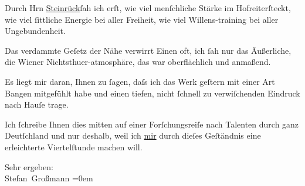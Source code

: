 \pstart
           Durch Hrn \uline{Steinrück}ſah ich erſt, wie viel menſchliche Stärke im Hofreiterſteckt, wie viel{ }ſittliche Energie bei aller Freiheit, wie viel
               Willens-training bei aller Ungebundenheit.\pend
           
\pstart
           Das verdammte Geſetz der Nähe verwirrt Einen oft, ich{ }ſah nur {\pb}das Äußerliche, die Wiener Nichtsthuer-atmosphäre, das war oberflächlich und
               anmaßend.\pend
           
\pstart
           Es liegt mir daran, Ihnen zu{ }ſagen, daſs ich das Werk geſtern mit einer Art Bangen
               mitgefühlt habe und einen tiefen, nicht{ }ſchnell zu verwiſchenden Eindruck nach Hauſe
               trage.\pend
           
\pstart
           Ich{ }ſchreibe Ihnen dies mitten auf einer Forſchungsreiſe nach Talenten durch ganz Deutſchland und nur deshalb, {\pb}weil ich \uline{mir}
               durch dieſes Geſtändnis eine erleichterte Viertelſtunde machen will.\pend
           
\pstart
           Sehr ergeben:{\\[\baselineskip]}\spacefill\mbox{Stefan Großmann}\pend
           \leftskip=0em{}\endnumbering{}  \newcommand{\dateiname}{L02052}\newcommand{\titel}{Stefan Großmann an Arthur Schnitzler, 5. 2. 1912}\newcommand{\editorInnen}{Herausgegeben von Martin Anton Müller}
